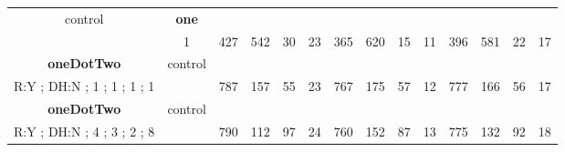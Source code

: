 \begin{table}[H]
{\begin{tabular}{|c|c|c|c|c|c|c|c|c|c|c|c|c|c|}
control & \cellcolor{blue!15}\textbf{one}& {\color[HTML]{00009B} } & {\color[HTML]{9A0000} } & {\color[HTML]{009901} } &  & {\color[HTML]{00009B} } & {\color[HTML]{9A0000} } & {\color[HTML]{009901} } &  & {\color[HTML]{00009B} } & {\color[HTML]{9A0000} } & {\color[HTML]{009901} } &  \\ 
 & \cellcolor{ blue!15}1 & \multirow{-2}{*}{{\color[HTML]{00009B} 427}} & \multirow{-2}{*}{{\color[HTML]{9A0000} 542}} & \multirow{-2}{*}{{\color[HTML]{009901} 30}} & \multirow{-2}{*}{23} & \multirow{-2}{*}{{\color[HTML]{00009B} 365}} & \multirow{-2}{*}{{\color[HTML]{9A0000} 620}} & \multirow{-2}{*}{{\color[HTML]{009901} 15}} & \multirow{-2}{*}{11} & \multirow{-2}{*}{{\color[HTML]{00009B} 396}} & \multirow{-2}{*}{{\color[HTML]{9A0000} 581}} & \multirow{-2}{*}{{\color[HTML]{009901} 22}} & \multirow{-2}{*}{17} \\ \hline


\cellcolor{blue!15}\textbf{oneDotTwo} & control& {\color[HTML]{00009B} } & {\color[HTML]{9A0000} } & {\color[HTML]{009901} } &  & {\color[HTML]{00009B} } & {\color[HTML]{9A0000} } & {\color[HTML]{009901} } &  & {\color[HTML]{00009B} } & {\color[HTML]{9A0000} } & {\color[HTML]{009901} } &  \\ 
\cellcolor{ blue!15}R:Y ; DH:N ; 1 ; 1 ; 1 ; 1 &  & \multirow{-2}{*}{{\color[HTML]{00009B} 787}} & \multirow{-2}{*}{{\color[HTML]{9A0000} 157}} & \multirow{-2}{*}{{\color[HTML]{009901} 55}} & \multirow{-2}{*}{23} & \multirow{-2}{*}{{\color[HTML]{00009B} 767}} & \multirow{-2}{*}{{\color[HTML]{9A0000} 175}} & \multirow{-2}{*}{{\color[HTML]{009901} 57}} & \multirow{-2}{*}{12} & \multirow{-2}{*}{{\color[HTML]{00009B} 777}} & \multirow{-2}{*}{{\color[HTML]{9A0000} 166}} & \multirow{-2}{*}{{\color[HTML]{009901} 56}} & \multirow{-2}{*}{17} \\ \hline

\cellcolor{blue!15}\textbf{oneDotTwo} & control& {\color[HTML]{00009B} } & {\color[HTML]{9A0000} } & {\color[HTML]{009901} } &  & {\color[HTML]{00009B} } & {\color[HTML]{9A0000} } & {\color[HTML]{009901} } &  & {\color[HTML]{00009B} } & {\color[HTML]{9A0000} } & {\color[HTML]{009901} } &  \\ 
\cellcolor{ blue!15}R:Y ; DH:N ; 4 ; 3 ; 2 ; 8 &  & \multirow{-2}{*}{{\color[HTML]{00009B} 790}} & \multirow{-2}{*}{{\color[HTML]{9A0000} 112}} & \multirow{-2}{*}{{\color[HTML]{009901} 97}} & \multirow{-2}{*}{24} & \multirow{-2}{*}{{\color[HTML]{00009B} 760}} & \multirow{-2}{*}{{\color[HTML]{9A0000} 152}} & \multirow{-2}{*}{{\color[HTML]{009901} 87}} & \multirow{-2}{*}{13} & \multirow{-2}{*}{{\color[HTML]{00009B} 775}} & \multirow{-2}{*}{{\color[HTML]{9A0000} 132}} & \multirow{-2}{*}{{\color[HTML]{009901} 92}} & \multirow{-2}{*}{18} \\ \hline


\end{tabular}}
\end{table}
